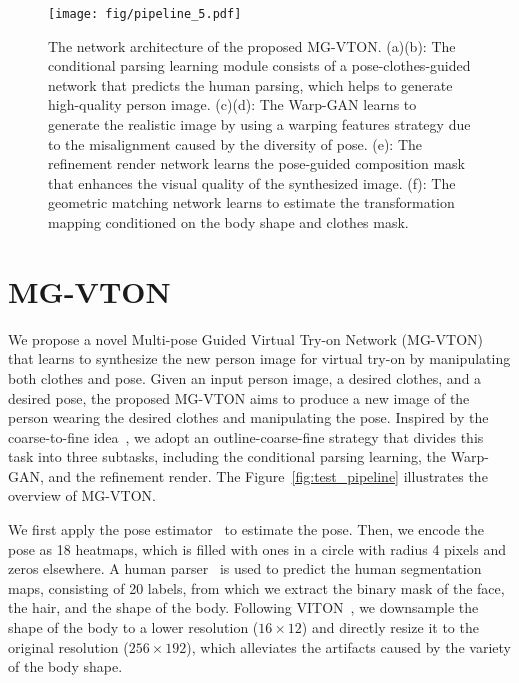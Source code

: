 \documentclass[10pt,twocolumn,letterpaper]{article}
\begin{document}
\begin{figure*}[!ht]
\centering
\texttt{[image: fig/pipeline\_5.pdf]} 
\caption{The network architecture of the proposed MG-VTON. (a)(b): The conditional parsing learning module consists of a pose-clothes-guided network that predicts the human parsing, which helps to generate high-quality person image. (c)(d): The Warp-GAN learns to generate the realistic image by using a warping features strategy due to the misalignment caused by the diversity of pose. (e): The refinement render network learns the pose-guided composition mask that enhances the visual quality of the synthesized image. (f): The geometric matching network learns to estimate the transformation mapping conditioned on the body shape and clothes mask.}
\label{fig:train_pipeline}
\vspace{-4mm}
\end{figure*}

\section{MG-VTON}
We propose a novel Multi-pose Guided Virtual Try-on Network (MG-VTON) that learns to synthesize the new person image for virtual try-on by manipulating both clothes and pose. Given an input person image, a desired clothes, and a desired pose, the proposed MG-VTON aims to produce a new image of the person wearing the desired clothes and manipulating the pose. Inspired by the coarse-to-fine idea~\cite{han2017viton,ma2017pose}, we adopt an outline-coarse-fine strategy that divides this task into three subtasks, including the conditional parsing learning, the Warp-GAN, and the refinement render. The Figure~\ref{fig:test_pipeline} illustrates the overview of MG-VTON. 

We first apply the pose estimator~\cite{cao2017openpose} to estimate the pose. Then, we encode the pose as 18 heatmaps, which is filled with ones in a circle with radius 4 pixels and zeros elsewhere. A human parser~\cite{gong2017look} is used to predict the human segmentation maps, consisting of 20 labels, from which we extract the binary mask of the face, the hair, and the shape of the body. Following VITON~\cite{han2017viton}, we downsample the shape of the body to a lower resolution ($16 \times 12$) and directly resize it to the original resolution  ($256 \times 192$), which alleviates the artifacts caused by the variety of the body shape.
\end{document}
